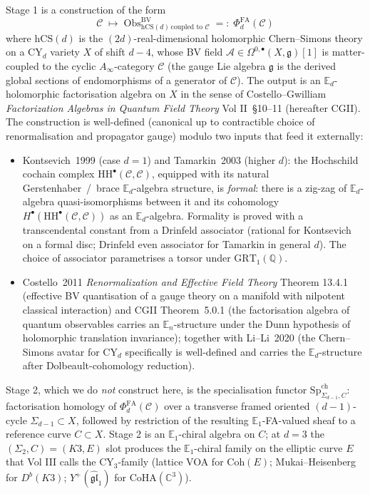 \documentclass[11pt]{article}
\theoremstyle{definition}
\providecommand{\CC}{\mathbb{C}}
\providecommand{\QQ}{\mathbb{Q}}
\providecommand{\HH}{\mathrm{HH}}
\providecommand{\fg}{\mathfrak{g}}
\providecommand{\cA}{\mathcal{A}}
\providecommand{\cC}{\mathcal{C}}
\providecommand{\Obs}{\mathrm{Obs}}
\providecommand{\hCS}{\mathrm{hCS}}
\providecommand{\FA}{\mathrm{FA}}
\providecommand{\Coh}{\mathrm{Coh}}
\providecommand{\CoHA}{\mathrm{CoHA}}
\begin{document}
Stage 1 is a construction of the form
\begin{equation}
  \cC \;\longmapsto\; \Obs^{\mathrm{BV}}_{\hCS(d)\,\text{coupled to }\cC}
  \;=:\; \Phi^{\FA}_d(\cC)
  \label{eq:stage1-definition}
\end{equation}
where $\hCS(d)$ is the $(2d)$-real-dimensional holomorphic
Chern--Simons theory on a CY$_d$ variety $X$ of shift $d-4$, whose BV
field $\cA \in \Omega^{0,\bullet}(X,\fg)[1]$ is matter-coupled to the
cyclic $A_\infty$-category $\cC$ (the gauge Lie algebra $\fg$ is the
derived global sections of endomorphisms of a generator of $\cC$).
The output is an $\mathbb{E}_d$-holomorphic factorisation algebra on
$X$ in the sense of Costello--Gwilliam \emph{Factorization Algebras in
Quantum Field Theory} Vol II~\S10--11 (hereafter CGII). The
construction is well-defined (canonical up to contractible choice of
renormalisation and propagator gauge) modulo two inputs that feed it
externally:
\begin{itemize}
  \item[(KT)] Kontsevich~1999 (case $d=1$) and Tamarkin~2003 (higher
        $d$): the Hochschild cochain complex $\HH^\bullet(\cC,\cC)$,
        equipped with its natural Gerstenhaber~/~brace $\mathbb{E}_d$-algebra
        structure, is \emph{formal}: there is a zig-zag of
        $\mathbb{E}_d$-algebra quasi-isomorphisms between it and its
        cohomology $H^\bullet(\HH^\bullet(\cC,\cC))$ as an
        $\mathbb{E}_d$-algebra. Formality is proved with a transcendental
        constant from a Drinfeld associator (rational for Kontsevich on
        a formal disc; Drinfeld even associator for Tamarkin in general
        $d$). The choice of associator parametrises a torsor under
        $\mathrm{GRT}_1(\QQ)$.
  \item[(CGL)] Costello~2011 \emph{Renormalization and Effective Field
        Theory} Theorem 13.4.1 (effective BV quantisation of a gauge
        theory on a manifold with nilpotent classical interaction) and
        CGII Theorem~5.0.1 (the factorisation algebra of quantum
        observables carries an $\mathbb{E}_n$-structure under the Dunn
        hypothesis of holomorphic translation invariance); together with
        Li--Li~2020 (the Chern--Simons avatar for CY$_d$ specifically is
        well-defined and carries the $\mathbb{E}_d$-structure after
        Dolbeault-cohomology reduction).
\end{itemize}
Stage 2, which we do \emph{not} construct here, is the specialisation
functor $\mathrm{Sp}^{\mathrm{ch}}_{\Sigma_{d-1},C}$: factorisation
homology of $\Phi^{\FA}_d(\cC)$ over a transverse framed oriented
$(d-1)$-cycle $\Sigma_{d-1}\subset X$, followed by restriction of the
resulting $\mathbb{E}_1$-FA-valued sheaf to a reference curve $C\subset X$.
Stage 2 is an $\mathbb{E}_1$-chiral algebra on $C$; at $d=3$ the
$(\Sigma_2, C) = (K3, E)$ slot produces the $\mathbb{E}_1$-chiral
family on the elliptic curve $E$ that Vol III calls the
$\mathrm{CY}_3$-family (lattice VOA for $\Coh(E)$; Mukai--Heisenberg
for $D^b(K3)$; $Y^+(\widehat{\mathfrak{gl}}_1)$ for $\CoHA(\CC^3)$).
\end{document}
